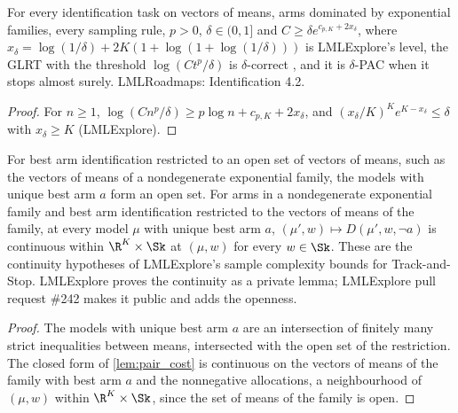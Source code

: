 \begin{lemma}
  \label{prereq:deviational}
  \leanok
  For every identification task on vectors of means, arms dominated by exponential families,
  every sampling rule, $p > 0$, $\delta \in (0, 1]$ and $C \ge \delta e^{c_{p,K} + 2x_\delta}$,
  where $x_\delta = \log(1/\delta) + 2K(1 + \log(1 + \log(1/\delta)))$ is LMLExplore's level,
  the GLRT with the threshold $\log(C t^p / \delta)$ is $\delta$-correct
  \cite[Proposition 12]{GK16}, and it is $\delta$-PAC when it stops almost surely.
  LMLRoadmaps: Identification 4.2.
\end{lemma}

\begin{proof}
  \leanok
  For $n \ge 1$, $\log(C n^p/\delta) \ge p \log n + c_{p,K} + 2x_\delta$, and
  $(x_\delta/K)^K e^{K - x_\delta} \le \delta$ with $x_\delta \ge K$ (LMLExplore).
\end{proof}

\begin{lemma}
  \label{prereq:bai_continuity}
  \leanok
  For best arm identification restricted to an open set of vectors of means, such as the vectors
  of means of a nondegenerate exponential family, the models with unique best arm $a$ form an open
  set. For arms in a nondegenerate exponential family and best arm identification restricted to
  the vectors of means of the family, at every model $\mu$ with unique best arm $a$,
  $(\mu', w) \mapsto D(\mu', w, \neg a)$ is continuous within $\R^K \times \Sk$ at $(\mu, w)$ for
  every $w \in \Sk$. These are the continuity hypotheses of LMLExplore's sample complexity bounds
  for Track-and-Stop. LMLExplore proves the continuity as a private lemma; LMLExplore pull request
  \#242 makes it public and adds the openness.
\end{lemma}

\begin{proof}
  \leanok
  The models with unique best arm $a$ are an intersection of finitely many strict inequalities
  between means, intersected with the open set of the restriction. The closed form of
  \cref{lem:pair_cost} is continuous on the vectors of means of the family with best arm $a$ and
  the nonnegative allocations, a neighbourhood of $(\mu, w)$ within $\R^K \times \Sk$, since the
  set of means of the family is open.
\end{proof}

